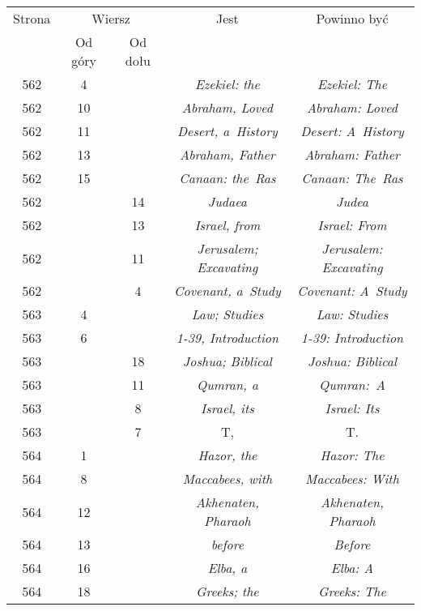 \documentclass[a4paper,11pt]{article}
\numberwithin{equation}{section}
\begin{document}
\begin{center}
  \begin{tabular}{|c|c|c|c|c|}
    \hline
    Strona & \multicolumn{2}{c|}{Wiersz} & Jest
                              & Powinno być \\ \cline{2-3}
    & Od góry & Od dołu & & \\
    \hline
    562 & \hphantom{0}4 & & \textit{Ezekiel: the} & \textit{Ezekiel: The} \\
    562 & 10 & & \textit{Abraham, Loved} & \textit{Abraham: Loved} \\
    562 & 11 & & \textit{Desert, a~History} & \textit{Desert: A~History} \\
    562 & 13 & & \textit{Abraham, Father} & \textit{Abraham: Father} \\
    562 & 15 & & \textit{Canaan: the~Ras} & \textit{Canaan: The~Ras} \\
    562 & & 14 & \textit{Judaea} & \textit{Judea} \\
    562 & & 13 & \textit{Israel, from} & \textit{Israel: From} \\
    562 & & 11 & \textit{Jerusalem; Excavating}
           & \textit{Jerusalem: Excavating} \\
    562 & & \hphantom{0}4 & \textit{Covenant, a~Study}
    & \textit{Covenant: A~Study} \\
    563 & \hphantom{0}4 & & \textit{Law; Studies} & \textit{Law: Studies} \\
    563 & \hphantom{0}6 & & \textit{1-39, Introduction}
           & \textit{1-39: Introduction} \\
    563 & & 18 & \textit{Joshua; Biblical} & \textit{Joshua: Biblical} \\
    563 & & 11 & \textit{Qumran, a} & \textit{Qumran:~A} \\
    563 & & \hphantom{0}8 & \textit{Israel, its} & \textit{Israel: Its} \\
    563 & & \hphantom{0}7 & T, & T. \\
    564 & \hphantom{0}1 & & \textit{Hazor, the} & \textit{Hazor: The} \\
    564 & \hphantom{0}8 & & \textit{Maccabees, with}
    & \textit{Maccabees: With} \\
    564 & 12 & & \textit{Akhenaten, Pharaoh}
           & \textit{Akhenaten, Pharaoh} \\
    564 & 13 & & \textit{before} & \textit{Before} \\
    564 & 16 & & \textit{Elba, a} & \textit{Elba: A} \\
    564 & 18 & & \textit{Greeks; the} & \textit{Greeks: The} \\

\end{tabular}
\end{center}
\end{document}
